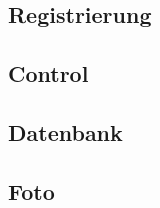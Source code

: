 \subsection{Registrierung}
\label{subsec.registrierung}

\subsection{Control}
\label{subsec.control}

\subsection{Datenbank}
\label{subsec.datenbank}

\subsection{Foto}
\label{subsec.foto}